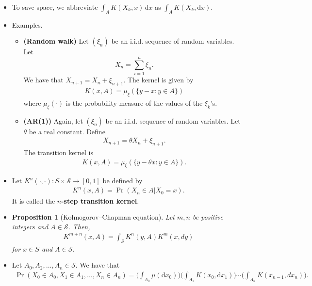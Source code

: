 \documentclass[10pt]{article}
\newtheorem{proposition}[lemma]{Proposition}
\newcommand{\dee}{\mathrm{d}}
\newcommand{\mcal}[1]{\mathcal{#1}}
\begin{document}
\begin{itemize}
  \item To save space, we abbreviate $\int_A K(X_k, x)\, \dee x$ as $\int_A K(X_k, \dee x)$.
  
  \item Examples.
  \begin{itemize}
    \item {\bf (Random walk)} Let $(\xi_n)$ be an i.i.d. sequence of random variables. Let $$X_n = \sum_{i=1}^n \xi_n.$$ We have that $X_{n+1} = X_n + \xi_{n+1}$. The kernel is given by
    \begin{align*}
      K(x,A) = \mu_{\xi}(\{ y - x : y \in A \})
    \end{align*}
    where $\mu_{\xi}(\cdot)$ is the probability measure of the values of the $\xi_k$'s.

    \item {\bf (AR(1))} Again, let $(\xi_n)$ be an i.i.d. sequence of random variables. Let $\theta$ be a real constant. Define
    \begin{align*}
      X_{n+1} = \theta X_{n} + \xi_{n+1}.
    \end{align*}
    The transition kernel is
    \begin{align*}
      K(x, A) = \mu_{\xi}(\{ y - \theta x : y \in A \}).
    \end{align*}
  \end{itemize}

  \item Let $K^n(\cdot,\cdot): S \times \mcal{S} \rightarrow [0,1]$ be defined by
  \begin{align*}
    K^n(x, A) = \Pr(X_n \in A | X_0 = x).
  \end{align*}
  It is called the {\bf $n$-step transition kernel}.  

  \item \begin{proposition}[Kolmogorov--Chapman equation]
    Let $m,n$ be positive integers and $A \in \mcal{S}$. Then,
    \begin{align*}
      K^{m+n}(x, A) = \int_S K^n(y, A) K^m(x, dy)
    \end{align*}
    for $x \in S$ and $A \in \mcal{S}$.
  \end{proposition}

  \item Let $A_0, A_2, \dotsc, A_n \in \mcal{S}$. We have that
  \begin{align*}
    \Pr(X_0 \in A_0, X_1 \in A_1, \dotsc, X_n \in A_n)
    = \bigg( \int_{A_0} \mu(\dee x_0) \bigg) \bigg( \int_{A_1} K(x_0, \dee x_1) \bigg) \dotsb \bigg( \int_{A_n} K(x_{n-1}, dx_n) \bigg).
  \end{align*}


\end{itemize}
\end{document}
